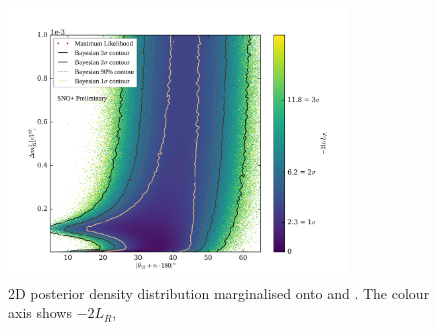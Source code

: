 \begin{figure}
    \centering
    \includegraphics[width=0.8\textwidth]{6_SolarAnalysis/images/steve_style_contours.png}
    \caption[2D posterior density distribution marginalised onto \dmsq{} and \tonetwo{}]
    {2D posterior density distribution marginalised onto \dmsq{} and \tonetwo{}. The colour axis shows $-2L_{R}$, }
    \label{fig:2d_osc_param_posterior}
\end{figure}

